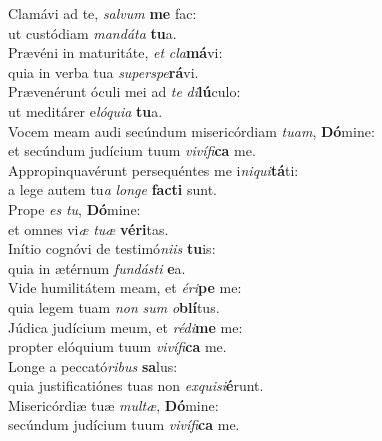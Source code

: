 \evenverse Clamávi ad te, \textit{sal}\textit{vum} \textbf{me} fac:~\*\\
\evenverse ut custódiam \textit{man}\textit{dá}\textit{ta} \textbf{tu}a.\\
\oddverse Prævéni in maturitáte, \textit{et} \textit{cla}\textbf{má}vi:~\*\\
\oddverse quia in verba tua \textit{su}\textit{per}\textit{spe}\textbf{rá}vi.\\
\evenverse Prævenérunt óculi mei ad \textit{te} \textit{di}\textbf{lú}culo:~\*\\
\evenverse ut meditárer e\textit{ló}\textit{qui}\textit{a} \textbf{tu}a.\\
\oddverse Vocem meam audi secúndum misericórdiam \textit{tu}\textit{am}, \textbf{Dó}mine:~\*\\
\oddverse et secúndum judícium tuum \textit{vi}\textit{ví}\textit{fi}\textbf{ca} me.\\
\evenverse Appropinquavérunt persequéntes me i\textit{ni}\textit{qui}\textbf{tá}ti:~\*\\
\evenverse a lege autem tu\textit{a} \textit{lon}\textit{ge} \textbf{fa}\textbf{cti} sunt.\\
\oddverse Prope \textit{es} \textit{tu}, \textbf{Dó}mine:~\*\\
\oddverse et omnes vi\textit{æ} \textit{tu}\textit{æ} \textbf{vé}\textbf{ri}tas.\\
\evenverse Inítio cognóvi de testimó\textit{ni}\textit{is} \textbf{tu}is:~\*\\
\evenverse quia in ætérnum \textit{fun}\textit{dá}\textit{sti} \textbf{e}a.\\
\oddverse Vide humilitátem meam, et \textit{é}\textit{ri}\textbf{pe} me:~\*\\
\oddverse quia legem tuam \textit{non} \textit{sum} \textit{o}\textbf{blí}tus.\\
\evenverse Júdica judícium meum, et \textit{ré}\textit{di}\textbf{me} me:~\*\\
\evenverse propter elóquium tuum \textit{vi}\textit{ví}\textit{fi}\textbf{ca} me.\\
\oddverse Longe a peccató\textit{ri}\textit{bus} \textbf{sa}lus:~\*\\
\oddverse quia justificatiónes tuas non \textit{ex}\textit{qui}\textit{si}\textbf{é}runt.\\
\evenverse Misericórdiæ tuæ \textit{mul}\textit{tæ}, \textbf{Dó}mine:~\*\\
\evenverse secúndum judícium tuum \textit{vi}\textit{ví}\textit{fi}\textbf{ca} me.\\
